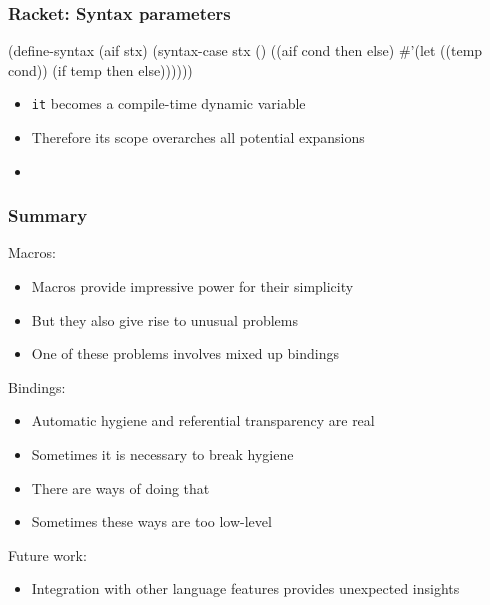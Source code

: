 \documentclass[hyperref={bookmarks=false}]{beamer}
\begin{document}
\begin{frame}[fragile]
\frametitle{Racket: Syntax parameters}
\begin{semiverbatim}

\text{\color{teal}{(define-syntax-parameter it (syntax-rules ()))}}

(define-syntax (aif stx)
  (syntax-case stx ()
    ((aif cond then else)
     #'(let ((temp cond))
             \text{\color{teal}{(syntax-parameterize}}
               \text{\color{teal}{((it (syntax-rules () ((_) temp))))}}
         (if temp then else))))))

\end{semiverbatim}

\begin{itemize}
\item \texttt{it} becomes a compile-time dynamic variable
\item Therefore its scope overarches all potential expansions
\item \text{\color{blue}{High-level language feature (dynamic variables) + macros = win}}
\end{itemize}
\end{frame}

\begin{frame}[fragile]
\frametitle{Summary}
Macros:
\begin{itemize}
\item Macros provide impressive power for their simplicity
\item But they also give rise to unusual problems
\item One of these problems involves mixed up bindings
\end{itemize}

\pause
Bindings:
\begin{itemize}
\item Automatic hygiene and referential transparency are real
\item Sometimes it is necessary to break hygiene
\item There are ways of doing that
\item Sometimes these ways are too low-level
\end{itemize}

\pause
Future work:
\begin{itemize}
\item Integration with other language features provides unexpected insights
\end{itemize}
\end{frame}
\end{document}
